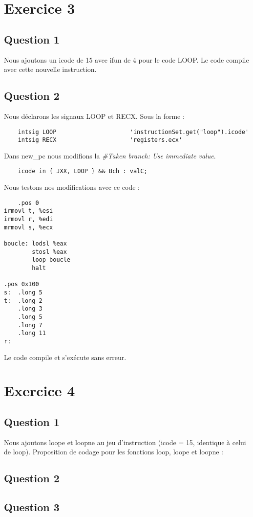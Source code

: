 \documentclass[a4paper,10pt]{article}
\begin{document}
\section{Exercice 3}
\subsection{Question 1}
Nous ajoutons un icode de 15 avec ifun de 4 pour le code LOOP. Le code compile avec cette nouvelle instruction.

\subsection{Question 2}
Nous déclarons les signaux LOOP et RECX. Sous la forme :
\begin{verbatim}
    intsig LOOP                     'instructionSet.get("loop").icode'
    intsig RECX                     'registers.ecx'
\end{verbatim}


Dans new\_pc nous modifions la \textit{\#Taken branch: Use immediate value}.

\begin{verbatim}
    icode in { JXX, LOOP } && Bch : valC;
\end{verbatim}

Nous testons nos modifications avec ce code :

\begin{verbatim}
    .pos 0
irmovl t, %esi
irmovl r, %edi
mrmovl s, %ecx

boucle: lodsl %eax
        stosl %eax
        loop boucle
        halt

.pos 0x100
s:  .long 5
t:  .long 2
    .long 3
    .long 5
    .long 7
    .long 11
r:

\end{verbatim}
Le code compile et s'exécute sans erreur.

\section{Exercice 4}
\subsection{Question 1}
Nous ajoutons loope et loopne au jeu d'instruction (icode = 15, identique à celui de loop).
Proposition de codage pour les fonctions loop, loope et loopne :

\subsection{Question 2}

\subsection{Question 3}
\end{document}

